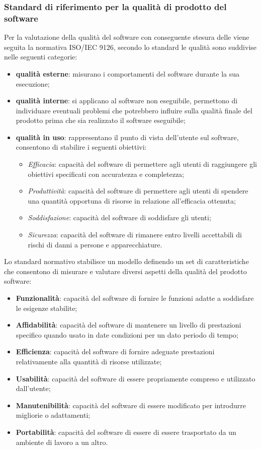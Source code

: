 \subsubsection{Standard di riferimento per la qualità di prodotto del software}
Per la valutazione della qualità del software con conseguente stesura delle  viene seguita la normativa ISO/IEC 9126, secondo lo standard le qualità sono suddivise nelle seguenti categorie:
\begin{itemize}
    \item \textbf{qualità esterne}: misurano i comportamenti del software durante la sua esecuzione;
    \item \textbf{qualità interne}: si applicano al software non eseguibile, permettono di individuare eventuali problemi che potrebbero influire sulla qualità finale del prodotto prima che sia realizzato il software eseguibile;
    \item \textbf{qualità in uso}: rappresentano il punto di vista dell'utente sul software, consentono di stabilire i seguenti obiettivi:
    \begin{itemize}
        \item \textit{Efficacia}: capacità del software di permettere agli utenti di raggiungere gli obiettivi specificati con accuratezza e completezza;
        \item \textit{Produttività}: capacità del software di permettere agli utenti di spendere una quantità opportuna di risorse in relazione all'efficacia ottenuta;
        \item \textit{Soddisfazione}: capacità del software di soddisfare gli utenti;
        \item \textit{Sicurezza}: capacità del software di rimanere entro livelli accettabili di rischi di danni a persone e apparecchiature.
    \end{itemize}
\end{itemize}
Lo standard normativo stabilisce un modello definendo un set di caratteristiche che consentono di misurare e valutare diversi aspetti della qualità del prodotto software:
\begin{itemize}
    \item \textbf{Funzionalità}: capacità del software di fornire le funzioni adatte a soddisfare le esigenze stabilite;
    \item \textbf{Affidabilità}: capacità del software di mantenere un livello di prestazioni specifico quando usato in date condizioni per un dato periodo di tempo;
    \item \textbf{Efficienza}: capacità del software di fornire adeguate prestazioni relativamente alla quantità di risorse utilizzate;
    \item \textbf{Usabilità}: capacità del software di essere propriamente compreso e utilizzato dall'utente;
    \item \textbf{Manutenibilità}: capacità del software di essere modificato per introdurre migliorie o adattamenti;
    \item \textbf{Portabilità}: capacità del software di essere di essere trasportato da un ambiente di lavoro a un altro.
\end{itemize}
